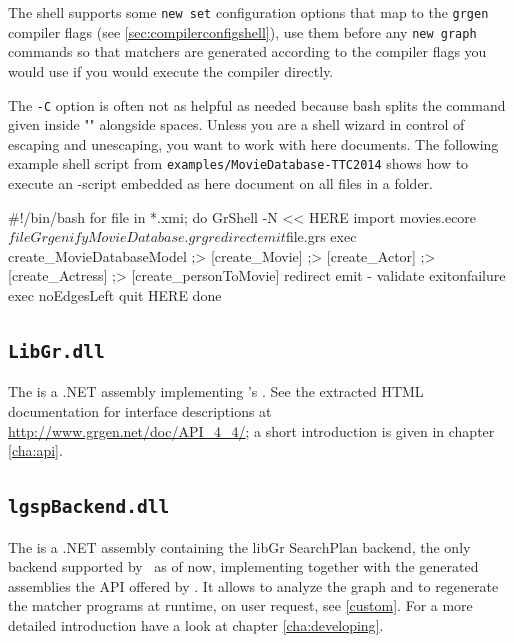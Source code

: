 \begin{note}
The shell supports some \texttt{new set} configuration options that map to the \texttt{grgen} compiler flags (see \ref{sec:compilerconfigshell}), use them before any \texttt{new graph} commands so that matchers are generated according to the compiler flags you would use if you would execute the compiler directly.
\end{note}

\begin{example}
The \texttt{-C} option is often not as helpful as needed because bash splits the command given inside "" alongside spaces.
Unless you are a shell wizard in control of escaping and unescaping, you want to work with here documents.
The following example shell script from \texttt{examples/MovieDatabase-TTC2014} shows how to execute an \GrShell-script embedded as here document on all files in a folder.
\begin{grshell}
#!/bin/bash
for file in *.xmi; do	
    GrShell -N << HERE
import movies.ecore $file GrgenifyMovieDatabase.grg
redirect emit $file.grs
exec create_MovieDatabaseModel ;> [create_Movie] ;> [create_Actor] ;> [create_Actress] ;> [create_personToMovie]
redirect emit - 
validate exitonfailure exec noEdgesLeft
quit
HERE
done
\end{grshell}
\end{example}

\subsection{\texttt{LibGr.dll}}
\label{sct:API}
The \LibGr{} is a .NET assembly implementing \GrG's .
See the extracted HTML documentation for interface descriptions at \url{http://www.grgen.net/doc/API_4_4/};
a short introduction is given in chapter \ref{cha:api}.

\subsection{\texttt{lgspBackend.dll}}
The \LGSPBackend{} is a .NET assembly containing the libGr SearchPlan backend, the only backend supported by \GrG~as of now, implementing together with the generated assemblies the API offered by \LibGr.
It allows to analyze the graph and to regenerate the matcher programs at runtime, on user request, see \ref{custom}.
For a more detailed introduction have a look at chapter \ref{cha:developing}.

